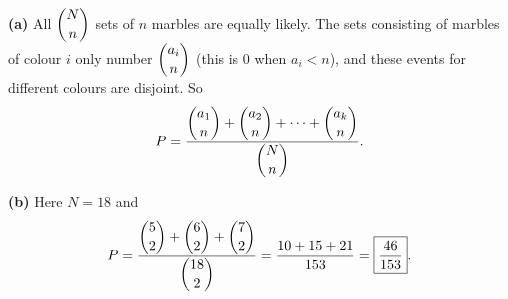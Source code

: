 \textbf{(a)} All $\dbinom{N}{n}$ sets of $n$ marbles are equally likely. The sets consisting of marbles of colour $i$ only number $\dbinom{a_i}{n}$ (this is $0$ when $a_i<n$), and these events for different colours are disjoint. So
\[
P=\dfrac{\dbinom{a_1}{n}+\dbinom{a_2}{n}+\cdots+\dbinom{a_k}{n}}{\dbinom{N}{n}} .
\]

\textbf{(b)} Here $N=18$ and
\[
P=\dfrac{\dbinom52+\dbinom62+\dbinom72}{\dbinom{18}{2}}=\dfrac{10+15+21}{153}=\boxed{\dfrac{46}{153}}.
\]
